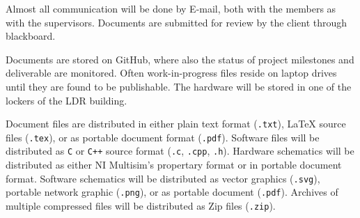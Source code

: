 Almost all communication will be done by E-mail, both with the members as with the supervisors. Documents are submitted for review by the client through blackboard.

Documents are stored on GitHub\cite{github}, where also the status of project milestones and deliverable are monitored. Often work-in-progress files reside on laptop drives until they are found to be publishable.  The hardware will be stored in one of the lockers of the LDR building.

Document files are distributed in either plain text format (\verb+.txt+), \LaTeX{} source files (\verb+.tex+), or as portable document format (\verb+.pdf+). Software files will be distributed as \verb+C+ or \verb-C++- source format (\verb+.c+, \verb+.cpp+, \verb+.h+). Hardware schematics will be distributed as either NI Multisim's propertary format or in portable document format. Software schematics will be distributed as vector graphics (\verb+.svg+), portable network graphic (\verb+.png+), or as portable document (\verb+.pdf+). Archives of multiple compressed files will be distributed as Zip files (\verb+.zip+).

